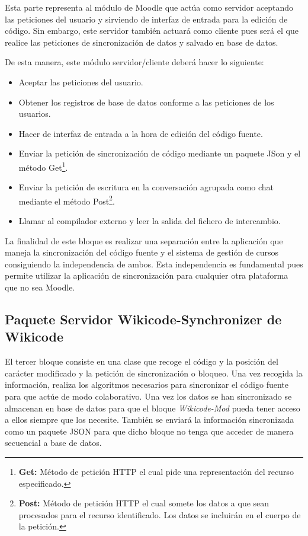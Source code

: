 Esta parte representa al módulo de Moodle que actúa como servidor aceptando las peticiones del usuario y sirviendo de interfaz de entrada para la edición de código. Sin embargo, este servidor también actuará como cliente pues será el que realice las peticiones de sincronización de datos y salvado en base de datos. 

De esta manera, este módulo servidor/cliente deberá hacer lo siguiente:

\begin{itemize}
	\item Aceptar las peticiones del usuario.
	\item Obtener los registros de base de datos conforme a las peticiones de los usuarios.
	\item Hacer de interfaz de entrada a la hora de edición del código fuente.
	\item Enviar la petición de sincronización de código mediante un paquete JSon y el método Get\footnote{\textbf{Get: }Método de petición HTTP el cual pide una representación del recurso especificado.}.
	\item Enviar la petición de escritura en la conversación agrupada como chat mediante el método Post\footnote{\textbf{Post: }Método de petición HTTP el cual somete los datos a que sean procesados para el recurso identificado. Los datos se incluirán en el cuerpo de la petición.}.
	\item Llamar al compilador externo y leer la salida del fichero de intercambio.
\end{itemize}

La finalidad de este bloque es realizar una separación entre la aplicación que maneja la sincronización del código fuente y el sistema de gestión de cursos consiguiendo la independencia de ambos. Esta independencia es fundamental pues permite utilizar la aplicación de sincronización para cualquier otra plataforma que no sea Moodle.

\subsection{Paquete Servidor Wikicode-Synchronizer de Wikicode} 

El tercer bloque consiste en una clase que recoge el código y la posición del carácter modificado y la petición de sincronización o bloqueo. Una vez recogida la información, realiza los algoritmos necesarios para sincronizar el código fuente para que actúe de modo colaborativo. Una vez los datos se han sincronizado se almacenan en base de datos para que el bloque \emph{Wikicode-Mod} pueda tener acceso a ellos siempre que los necesite. También se enviará la información sincronizada como un paquete JSON para que dicho bloque no tenga que acceder de manera secuencial a base de datos.


